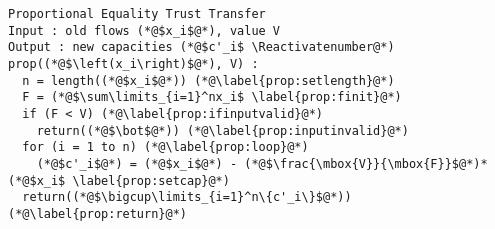 \Suppressnumber
\begin{lstlisting}[label=prop, style=numbers]
Proportional Equality Trust Transfer
Input : old flows (*@$x_i$@*), value V
Output : new capacities (*@$c'_i$ \Reactivatenumber@*)
prop((*@$\left(x_i\right)$@*), V) :
  n = length((*@$x_i$@*)) (*@\label{prop:setlength}@*)
  F = (*@$\sum\limits_{i=1}^nx_i$ \label{prop:finit}@*)
  if (F < V) (*@\label{prop:ifinputvalid}@*)
    return((*@$\bot$@*)) (*@\label{prop:inputinvalid}@*)
  for (i = 1 to n) (*@\label{prop:loop}@*)
    (*@$c'_i$@*) = (*@$x_i$@*) - (*@$\frac{\mbox{V}}{\mbox{F}}$@*)*(*@$x_i$ \label{prop:setcap}@*)
  return((*@$\bigcup\limits_{i=1}^n\{c'_i\}$@*)) (*@\label{prop:return}@*)
\end{lstlisting}
